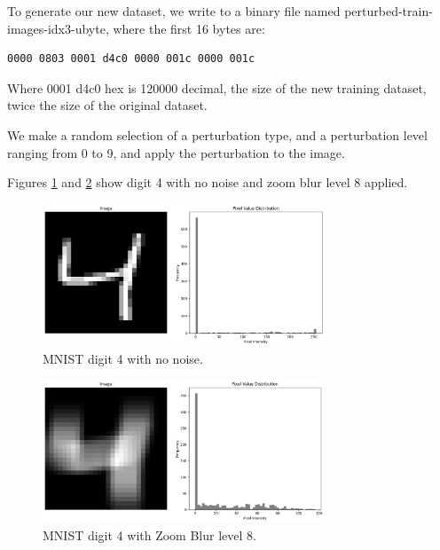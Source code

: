 
To generate our new dataset, we write to a binary file named perturbed-train-images-idx3-ubyte, where the first 16 bytes are:
\begin{verbatim}
0000 0803 0001 d4c0 0000 001c 0000 001c    
\end{verbatim}
Where 0001 d4c0 hex is 120000 decimal, the size of the new training dataset, twice the size of the original dataset.

We make a random selection of a perturbation type, and a perturbation level ranging from 0 to 9, and apply the perturbation to the image.

Figures \ref{fig:MNIST_4_clean_with_histogram} and \ref{fig:MNIST_4_noisy_with_histogram} show digit 4 with no noise and zoom blur level 8 applied.
\begin{figure}[h]
    \centering
    \includegraphics[width=0.75\textwidth]{Figures/Methods/MNIST_4_clean_with_histogram.png}
    \caption{MNIST digit 4 with no noise.}
    \label{fig:MNIST_4_clean_with_histogram}
\end{figure}

\begin{figure}[h]
    \centering
    \includegraphics[width=0.75\textwidth]{Figures/Methods/MNIST_4_noisy_with_histogram.png}
    \caption{MNIST digit 4 with Zoom Blur level 8.}
    \label{fig:MNIST_4_noisy_with_histogram}
\end{figure}


